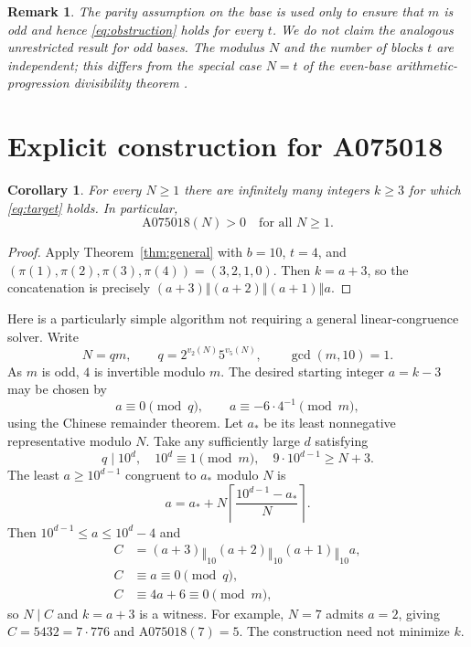\documentclass[10pt]{article}
\newtheorem{corollary}{Corollary}
\newtheorem{remark}{Remark}
\newcommand{\cat}{\mathbin{\Vert}}
\begin{document}
\begin{remark}
The parity assumption on the base is used only to ensure that
$m$ is odd and hence \eqref{eq:obstruction} holds for every $t$.
We do not claim the analogous unrestricted result for odd bases.
The modulus $N$ and the number of blocks $t$ are \emph{independent};
this differs from the special case $N=t$ of the even-base
arithmetic-progression divisibility theorem \cite{wang}.
\end{remark}

\section{Explicit construction for A075018}
\begin{corollary}\label{cor:oeis}
For every $N\ge1$ there are infinitely many integers $k\ge3$ for
which \eqref{eq:target} holds. In particular,
\[
 \boxed{\mathrm{A075018}(N)>0\quad\text{for all }N\ge1.}
\]
\end{corollary}
\begin{proof}
Apply Theorem~\ref{thm:general} with $b=10$, $t=4$,
and $(\pi(1),\pi(2),\pi(3),\pi(4))=(3,2,1,0)$.
Then $k=a+3$, so the concatenation is precisely
$(a+3)\cat(a+2)\cat(a+1)\cat a$.
\end{proof}

Here is a particularly simple algorithm not requiring a general
linear-congruence solver. Write
\[
 N=qm,\qquad q=2^{v_2(N)}5^{v_5(N)},\qquad\gcd(m,10)=1.
\]
As $m$ is odd, $4$ is invertible modulo $m$.
The desired starting integer $a=k-3$ may be chosen by
\begin{equation}\label{eq:crt4}
 a\equiv0\pmod q,\qquad
 a\equiv-6\cdot4^{-1}\pmod m,
\end{equation}
using the Chinese remainder theorem. Let $a_*$ be its least
nonnegative representative modulo $N$. Take any sufficiently large
$d$ satisfying
\begin{equation}\label{eq:width4}
 q\mid10^d,\quad10^d\equiv1\pmod m,\quad
 9\cdot10^{d-1}\ge N+3.
\end{equation}
The least $a\ge10^{d-1}$ congruent to $a_*$ modulo $N$ is
\begin{equation}\label{eq:a_explicit}
 a=a_*+N\left\lceil\frac{10^{d-1}-a_*}{N}\right\rceil.
\end{equation}
Then $10^{d-1}\le a\le10^d-4$ and
\begin{align*}
 C&=(a+3)\cat_{10}(a+2)\cat_{10}(a+1)\cat_{10}a,\\
 C&\equiv a\equiv0\pmod q,\\
 C&\equiv4a+6\equiv0\pmod m,
\end{align*}
so $N\mid C$ and $k=a+3$ is a witness.
For example, $N=7$ admits $a=2$, giving
$C=5432=7\cdot776$ and $\mathrm{A075018}(7)=5$.
The construction need not minimize $k$.
\end{document}
